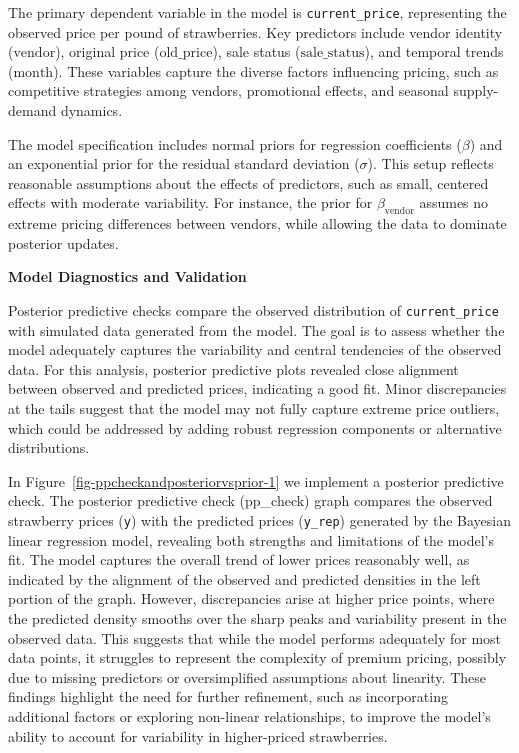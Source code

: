 \documentclass[
  letterpaper,
  DIV=11,
  numbers=noendperiod]{scrartcl}
\begin{document}
The primary dependent variable in the model is \texttt{current\_price},
representing the observed price per pound of strawberries. Key
predictors include vendor identity (\(\text{vendor}\)), original price
(\(\text{old\_price}\)), sale status (\(\text{sale\_status}\)), and
temporal trends (\(\text{month}\)). These variables capture the diverse
factors influencing pricing, such as competitive strategies among
vendors, promotional effects, and seasonal supply-demand dynamics.

The model specification includes normal priors for regression
coefficients (\(\beta\)) and an exponential prior for the residual
standard deviation (\(\sigma\)). This setup reflects reasonable
assumptions about the effects of predictors, such as small, centered
effects with moderate variability. For instance, the prior for
\(\beta_{\text{vendor}}\) assumes no extreme pricing differences between
vendors, while allowing the data to dominate posterior updates.

\textbf{Model Diagnostics and Validation}

Posterior predictive checks compare the observed distribution of
\texttt{current\_price} with simulated data generated from the model.
The goal is to assess whether the model adequately captures the
variability and central tendencies of the observed data. For this
analysis, posterior predictive plots revealed close alignment between
observed and predicted prices, indicating a good fit. Minor
discrepancies at the tails suggest that the model may not fully capture
extreme price outliers, which could be addressed by adding robust
regression components or alternative distributions.

In Figure~\ref{fig-ppcheckandposteriorvsprior-1} we implement a
posterior predictive check. The posterior predictive check (pp\_check)
graph compares the observed strawberry prices (\texttt{y}) with the
predicted prices (\texttt{y\_rep}) generated by the Bayesian linear
regression model, revealing both strengths and limitations of the
model's fit. The model captures the overall trend of lower prices
reasonably well, as indicated by the alignment of the observed and
predicted densities in the left portion of the graph. However,
discrepancies arise at higher price points, where the predicted density
smooths over the sharp peaks and variability present in the observed
data. This suggests that while the model performs adequately for most
data points, it struggles to represent the complexity of premium
pricing, possibly due to missing predictors or oversimplified
assumptions about linearity. These findings highlight the need for
further refinement, such as incorporating additional factors or
exploring non-linear relationships, to improve the model's ability to
account for variability in higher-priced strawberries.
\end{document}
